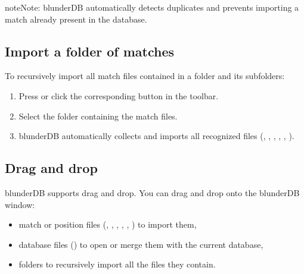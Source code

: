 \documentclass[letterpaper,10pt,english]{sphinxmanual}
\begin{document}
\begin{sphinxadmonition}{note}{Note:}
\sphinxAtStartPar
blunderDB automatically detects duplicates and prevents importing a match already present in the database.
\end{sphinxadmonition}


\subsection{Import a folder of matches}
\label{\detokenize{guide_utilisateur:importer-un-dossier-de-matchs}}
\sphinxAtStartPar
To recursively import all match files contained in a folder and its subfolders:
\begin{enumerate}
%
\item {} 
\sphinxAtStartPar
Press  or click the corresponding button in the toolbar.

\item {} 
\sphinxAtStartPar
Select the folder containing the match files.

\item {} 
\sphinxAtStartPar
blunderDB automatically collects and imports all recognized files (, , , , , ).

\end{enumerate}


\subsection{Drag and drop}
\label{\detokenize{guide_utilisateur:glisser-deposer}}
\sphinxAtStartPar
blunderDB supports drag and drop. You can drag and drop onto the blunderDB window:
\begin{itemize}
\item {} 
\sphinxAtStartPar
match or position files (, , , , , ) to import them,

\item {} 
\sphinxAtStartPar
database files () to open or merge them with the current database,

\item {} 
\sphinxAtStartPar
folders to recursively import all the files they contain.

\end{itemize}
\end{document}
